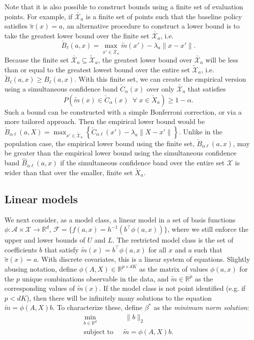 \documentclass[12pt]{article}
\theoremstyle{definition}
\newcommand{\R}{\ensuremath{\mathbb{R}}}
\newcommand{\<}{\langle}
\renewcommand{\>}{\rangle}
\newcommand\mcal[1]{\ensuremath{\mathcal{#1}}}
\begin{document}
Note that it is also possible to construct bounds using a finite set of
evaluation points. For example, if $\check{\mathcal{X}_a}$ is a finite set
of points such that the baseline policy satisfies $\tilde{\pi}(x) = a$, an
alternative procedure to construct a lower bound is to take the greatest lower
bound over the finite set $\check{\mathcal{X}_a}$, i.e.
\[
\check{B}_\ell(a,x) = \max_{x' \in \check{\mathcal{X}_a}} \tilde{m}(x') - \lambda_a \|x - x'\|.
\]
Because the finite set $\check{\mathcal{X}_a} \subseteq \tilde{\mathcal{X}}_a$,
the greatest lower bound over $\check{\mathcal{X}_a}$  will be less than
or equal to the greatest lowest bound over the entire set $\tilde{\mathcal{X}}_a$,
i.e. $\check{B}_\ell(a,x) \geq B_{\ell}(a,x)$. With this finite set, we can
create the empirical version using a simultaneous confidence band
$\check{C}_\alpha(x) $ over only $\check{\mathcal{X}_a}$ that satisfies 
\[
  P\left(\tilde{m}(x) \in \check{C}_\alpha(x) \;\; \forall \; x \in \check{X}_a \right) \geq 1 - \alpha.
\]
Such a bound can be constructed with a simple Bonferroni correction, or via
a more tailored approach.
Then the empirical lower bound would be $\check{B}_{\alpha \ell}(a,X) = \max_{x' \in
\check{\mcal{X}}_a}\left\{ \check{C}_{\alpha \ell}(x') - \lambda_a
\|X - x'\| \right\}$. Unlike in the population case, the empirical lower bound
using the finite set, $\check{B}_{\alpha \ell}(a,x)$, may be greater than
the empirical lower bound using the simultaneous confidence band $\widehat{B}_{\alpha \ell}(a,x)$ if the simultaneous confidence band over the entire set
$\mathcal{X}$ is wider than that over the smaller, finite set $\check{X}_a$.

\subsection{Linear models}
\label{sec:glm}

We next consider, as a model class, a linear model in a
set of basis functions $\phi:\mcal{A} \times \mcal{X} \to \R^d$,
$\mcal{F}= \{f(a,x) = h^{-1}(b^\top \phi(a, x))\}$, where we still
enforce the upper and lower bounds of $U$ and $L$.  The restricted
model class is the set of coefficients $b$ that satisfy
$\tilde{m}(x) = b^\top \phi(a, x)$ for all $x$ and $a$ such that
$\tilde{\pi}(x) =a$.
With discrete covariates, this is a linear system of equations. Slightly
abusing notation, define $\phi(A, X) \in \R^{p \times d K}$ as the matrix of
values $\phi(a, x)$ for the $p$ unique combinations observable in the data,
and $\tilde{m} \in \R^p$ as the corresponding values of $\tilde{m}(x)$.
If the model class is not point identified (e.g. if $p < dK$), then there will be infinitely
many solutions to the equation $\tilde{m} = \phi(A, X) b$.
To characterize these, define
$\beta^\ast$ as the \emph{minimum norm solution}:
\begin{align*}
  \min_{b \in \R^d} \; & \; \|b\|_2\\
  \text{subject to } \; & \tilde{m} = \phi(A, X) b.
\end{align*}
\end{document}
